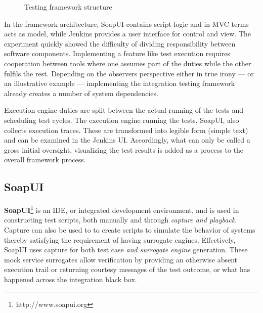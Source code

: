 \documentclass[12pt,a4paper,oneside,pdftex]{report}
\begin{document}
{{\begin{figure}[H]
\caption{Testing framework structure} \label{fig:structure}
\end{figure}

In the framework architecture, SoapUI contains script logic and in MVC terms acts as model, while Jenkins provides a user interface for control and view. The experiment quickly showed the difficulty of dividing responsibility between software components. Implementing a feature like test execution requires cooperation between tools where one assumes part of the duties while the other fulfils the rest. Depending on the observers perspective either in true irony --- or an illustrative example --- implementing the integration testing framework already creates a number of system dependencies.

Execution engine duties are split between the actual running of the tests and scheduling test cycles. The execution engine running the tests, SoapUI, also collects execution traces. These are transformed into legible form (simple text) and can be examined in the Jenkins UI. Accordingly, what can only be called a gross initial oversight, visualizing the test results is added as a process to the overall framework process.

\subsection{SoapUI}

\textbf{SoapUI}\footnote{http://www.soapui.org} is an IDE, or integrated development environment, and is used in constructing test scripts, both manually and through \emph{capture and playback}. Capture can also be used to to create scripts to simulate the behavior of systems thereby satisfying the requirement of having surrogate engines. Effectively, SoapUI uses capture for both test case \emph{and surrogate engine} generation. These mock service surrogates allow verification by providing an otherwise absent execution trail or returning courtesy messages of the test outcome, or what has happened across the integration black box.

}}
\end{document}
